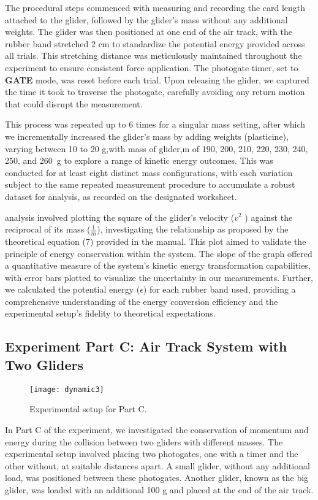 \documentclass[a4paper,11pt]{article}
\begin{document}
The procedural steps commenced with measuring and recording the card length attached to the glider, followed by the glider's mass without any additional weights. The glider was then positioned at one end of the air track, with the rubber band stretched 2 cm to standardize the potential energy provided across all trials. This stretching distance was meticulously maintained throughout the experiment to ensure consistent force application. The photogate timer, set to \textbf{GATE} mode, was reset before each trial. Upon releasing the glider, we captured the time it took to traverse the photogate, carefully avoiding any return motion that could disrupt the measurement.

This process was repeated up to 6 times for a singular mass setting, after which we incrementally increased the glider's mass by adding weights (plasticine), varying between 10 to 20 g,with mass of glider,m of 190, 200, 210, 220, 230, 240, 250, and \SI{260}{g} to explore a range of kinetic energy outcomes. This was conducted for at least eight distinct mass configurations, with each variation subject to the same repeated measurement procedure to accumulate a robust dataset for analysis, as recorded on the designated worksheet.

analysis involved plotting the square of the glider's velocity ($v^2$ ) against the reciprocal of its mass ($\frac{1}{m}$), investigating the relationship as proposed by the theoretical equation (7) provided in the manual. This plot aimed to validate the principle of energy conservation within the system. The slope of the graph offered a quantitative measure of the system's kinetic energy transformation capabilities, with error bars plotted to visualize the uncertainty in our measurements. Further, we calculated the potential energy ($\epsilon$) for each rubber band used, providing a comprehensive understanding of the energy conversion efficiency and the experimental setup's fidelity to theoretical expectations. 
\subsection*{Experiment Part C: Air Track System with Two Gliders}
\begin{figure}[ht]
    \centering
    \texttt{[image: dynamic3]}
    \caption{Experimental setup for Part C.}
    \label{fig:setupC}
\end{figure}
In Part C of the experiment, we investigated the conservation of momentum and energy during the collision between two gliders with different masses. The experimental setup involved placing two photogates, one with a timer and the other without, at suitable distances apart. A small glider, without any additional load, was positioned between these photogates. Another glider, known as the big glider, was loaded with an additional 100 g and placed at the end of the air track.
\end{document}

